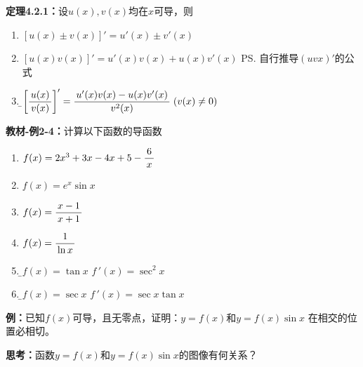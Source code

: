 {\bf 定理4.2.1：}设$u(x),v(x)$均在$x$可导，则
\begin{enumerate}[(1)]
  \setlength{\itemindent}{1cm}
  \item $[u(x)\pm v(x)]'=u'(x)\pm v'(x)$ 
  \item $[u(x)v(x)]' =u'(x)v(x)+u(x)v'(x)$ \ps{自行推导$(uvx)'$的公式}
  \item {\b$\left[\displaystyle\frac{\,{u(x)}\,}{\,{v(x)}\,}\right]'
  =\displaystyle\frac{\,{u'(x)v(x)-u(x)v'(x)}\,}{\,{v^2(x)}\,}\;(v(x)\ne 0)$}
\end{enumerate}

{\bf 教材-例2-4：}计算以下函数的导函数
\begin{enumerate}[(1)]
  \setlength{\itemindent}{1cm}
  \item $f(x)=2x^3+3x-4x+5-\displaystyle\frac{\,{6}\,}{\,{x}\,}$ 
  \item $f(x)=e^x\sin x$ 
  \item $f(x)=\displaystyle\frac{\,{x-1}\,}{\,{x+1}\,}$ 
  \item $f(x)=\displaystyle\frac{\,{1}\,}{\,{\ln x}\,}$ 
  \item {\b$f(x)=\tan x$ \hfill $f\,'(x)=\sec^2 x$ }
  \item {\b$f(x)=\sec x$ \hfill $f\,'(x)=\sec x\tan x$}
\end{enumerate}

{\bf 例：}已知$f(x)$可导，且无零点，证明：$y=f(x)$和$y=f(x)\sin x$
在相交的位置必相切。

{\bf 思考：}函数$y=f(x)$和$y=f(x)\sin x$的图像有何关系？

